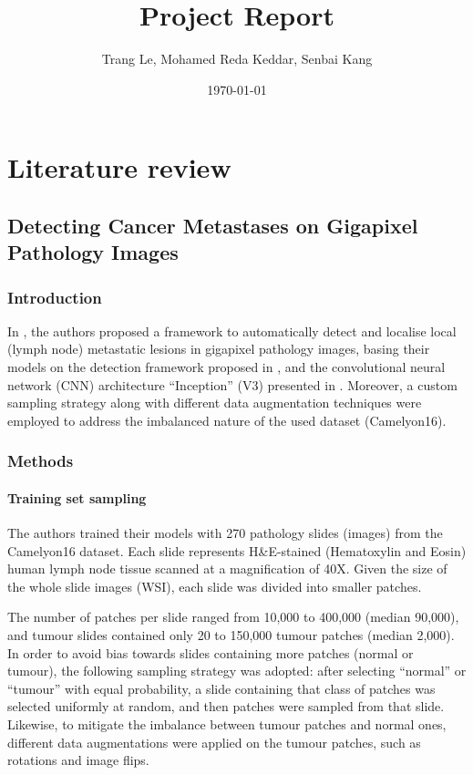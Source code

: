 \documentclass{article}
\title{Project Report}
\author{Trang Le, Mohamed Reda Keddar, Senbai Kang}
\date{\today}
\begin{document}
	
\maketitle

\tableofcontents

\newpage

\section{Literature review}

\subsection{Detecting Cancer Metastases on Gigapixel Pathology Images \cite{Liu2017DetectingCM}}

\subsubsection{Introduction}
In \cite{Liu2017DetectingCM}, the authors proposed a framework to automatically detect and localise local (lymph node) metastatic lesions in gigapixel pathology images, basing their models on the detection framework proposed in \cite{2016arXiv160605718W}, and the convolutional neural network (CNN) architecture “Inception” (V3) presented in \cite{Szegedy2015GoingDW}. Moreover, a custom sampling strategy along with different data augmentation techniques were employed to address the imbalanced nature of the used dataset (Camelyon16).

\subsubsection{Methods}

\paragraph{Training set sampling}
The authors trained their models with 270 pathology slides (images) from the Camelyon16 dataset. Each slide represents H\&E-stained (Hematoxylin and Eosin) human lymph node tissue scanned at a magnification of 40X. Given the size of the whole slide images (WSI), each slide was divided into smaller patches.

The number of patches per slide ranged from 10,000 to 400,000 (median 90,000), and tumour slides contained only 20 to 150,000 tumour patches (median 2,000). In order to avoid bias towards slides containing more patches (normal or tumour), the following sampling strategy was adopted: after selecting “normal” or “tumour” with equal probability, a slide containing that class of patches was selected uniformly at random, and then patches were sampled from that slide. Likewise, to mitigate the imbalance between tumour patches and normal ones, different data augmentations were applied on the tumour patches, such as rotations and image flips.
\end{document}

